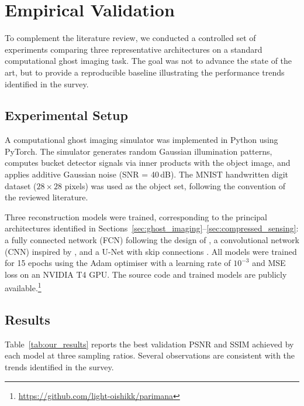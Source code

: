 \section{Empirical Validation}
\label{sec:empirical}

To complement the literature review, we conducted a controlled set of experiments comparing three representative architectures on a standard computational ghost imaging task. The goal was not to advance the state of the art, but to provide a reproducible baseline illustrating the performance trends identified in the survey.

\subsection{Experimental Setup}

A computational ghost imaging simulator was implemented in Python using PyTorch. The simulator generates random Gaussian illumination patterns, computes bucket detector signals via inner products with the object image, and applies additive Gaussian noise (SNR = 40\,dB). The MNIST handwritten digit dataset ($28 \times 28$ pixels) was used as the object set, following the convention of the reviewed literature.

Three reconstruction models were trained, corresponding to the principal architectures identified in Sections~\ref{sec:ghost_imaging}--\ref{sec:compressed_sensing}: a fully connected network (FCN) following the design of \citet{lyu2017}, a convolutional network (CNN) inspired by \citet{he2018}, and a U-Net with skip connections \citep{ronneberger2015}. All models were trained for 15 epochs using the Adam optimiser with a learning rate of $10^{-3}$ and MSE loss on an NVIDIA T4 GPU. The source code and trained models are publicly available.\footnote{\url{https://github.com/light-oishikk/parimana}}

\subsection{Results}

Table~\ref{tab:our_results} reports the best validation PSNR and SSIM achieved by each model at three sampling ratios. Several observations are consistent with the trends identified in the survey.

